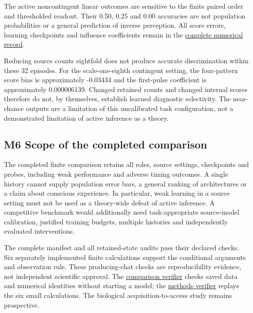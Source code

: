 \documentclass[
  american,
  11pt,
  letterpaper,
]{article}
\begin{document}
The active noncontingent linear outcomes are sensitive to the finite paired order and thresholded readout. Their 0.50, 0.25 and 0.00 accuracies are not population probabilities or a general prediction of inverse perception. All score errors, learning checkpoints and influence coefficients remain in the \href{https://github.com/v5ma/v5ma.github.io/blob/master/papers/companions/learning-to-feel-v1.0/ARTIFACT-AVAILABILITY.md#artifact-36}{complete numerical record}.

Reducing source counts eightfold does not produce accurate discrimination within these 32 episodes. For the scale-one-eighth contingent setting, the four-pattern score bias is approximately -0.03434 and the first-pulse coefficient is approximately 0.000006139. Changed retained counts and changed internal scores therefore do not, by themselves, establish learned diagnostic selectivity. The near-chance outputs are a limitation of this uncalibrated task configuration, not a demonstrated limitation of active inference as a theory.

\subsection{M6 Scope of the completed comparison}\label{m6-scope-of-the-completed-comparison}

The completed finite comparison retains all roles, source settings, checkpoints and probes, including weak performance and adverse timing outcomes. A single history cannot supply population error bars, a general ranking of architectures or a claim about conscious experience. In particular, weak learning in a source setting must not be used as a theory-wide defeat of active inference. A competitive benchmark would additionally need task-appropriate source-model calibration, justified training budgets, multiple histories and independently evaluated interventions.

The complete manifest and all retained-state audits pass their declared checks. Six separately implemented finite calculations support the conditional arguments and observation rule. These producing-chat checks are reproducibility evidence, not independent scientific approval. The \href{https://github.com/v5ma/v5ma.github.io/blob/master/papers/companions/learning-to-feel-v1.0/ARTIFACT-AVAILABILITY.md#artifact-34}{comparison verifier} checks saved data and numerical identities without starting a model; the \href{https://github.com/v5ma/v5ma.github.io/blob/master/papers/companions/learning-to-feel-v1.0/ARTIFACT-AVAILABILITY.md#artifact-35}{methods verifier} replays the six small calculations. The biological acquisition-to-access study remains prospective.

\endgroup
\end{document}
